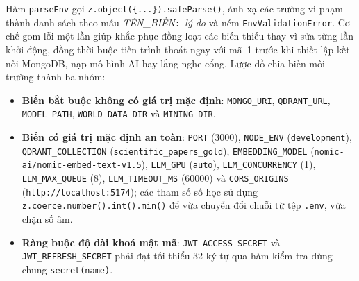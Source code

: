 Hàm \texttt{parseEnv} gọi \texttt{z.\allowbreak{}object(\{.\allowbreak{}.\allowbreak{}.\allowbreak{}\}).\allowbreak{}safeParse()}, ánh xạ các trường vi phạm thành danh sách theo mẫu \textit{TÊN\_BIẾN}\texttt{: }\textit{lý do} và ném \texttt{EnvValidationError}. Cơ chế gom lỗi một lần giúp khắc phục đồng loạt các biến thiếu thay vì sửa từng lần khởi động, đồng thời buộc tiến trình thoát ngay với mã~1 trước khi thiết lập kết nối MongoDB, nạp mô hình AI hay lắng nghe cổng. Lược đồ chia biến môi trường thành ba nhóm:

\begin{itemize}[label=--]
    \item \textbf{Biến bắt buộc không có giá trị mặc định}: \texttt{MONGO\_\allowbreak{}URI}, \texttt{QDRANT\_\allowbreak{}URL}, \texttt{MODEL\_\allowbreak{}PATH}, \texttt{WORLD\_\allowbreak{}DATA\_\allowbreak{}DIR} và \texttt{MINING\_\allowbreak{}DIR}.
    \item \textbf{Biến có giá trị mặc định an toàn}: \texttt{PORT} (3000), \texttt{NODE\_\allowbreak{}ENV} (\texttt{development}), \texttt{QDRANT\_\allowbreak{}COLLECTION} (\texttt{scientific\_\allowbreak{}papers\_\allowbreak{}gold}), \texttt{EMBEDDING\_\allowbreak{}MODEL} (\texttt{nomic-\allowbreak{}ai/\allowbreak{}nomic-\allowbreak{}embed-\allowbreak{}text-\allowbreak{}v1.\allowbreak{}5}), \texttt{LLM\_\allowbreak{}GPU} (\texttt{auto}), \texttt{LLM\_\allowbreak{}CONCURRENCY} (1), \texttt{LLM\_\allowbreak{}MAX\_\allowbreak{}QUEUE} (8), \texttt{LLM\_\allowbreak{}TIMEOUT\_\allowbreak{}MS} (60000) và \texttt{CORS\_\allowbreak{}ORIGINS} (\texttt{http:\allowbreak{}/\allowbreak{}/\allowbreak{}localhost:\allowbreak{}5174}); các tham số số học sử dụng \texttt{z.\allowbreak{}coerce.\allowbreak{}number().\allowbreak{}int().\allowbreak{}min()} để vừa chuyển đổi chuỗi từ tệp \texttt{.\allowbreak{}env}, vừa chặn số âm.
    \item \textbf{Ràng buộc độ dài khoá mật mã}: \texttt{JWT\_\allowbreak{}ACCESS\_\allowbreak{}SECRET} và \texttt{JWT\_\allowbreak{}REFRESH\_\allowbreak{}SECRET} phải đạt tối thiểu 32 ký tự qua hàm kiểm tra dùng chung \texttt{secret(name)}.
\end{itemize}

